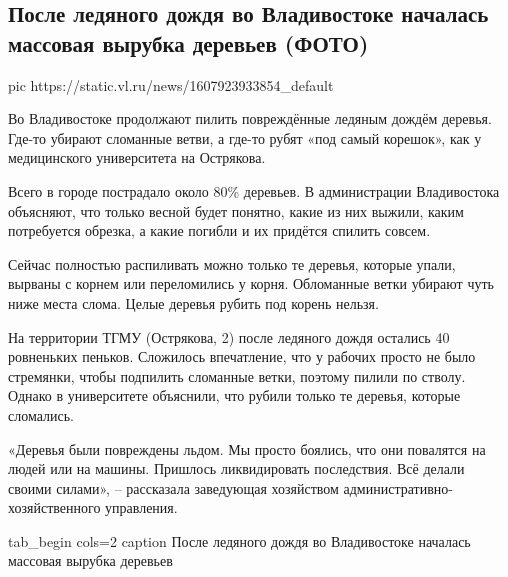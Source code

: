  
 
 
 
 
 
\subsection{После ледяного дождя во Владивостоке началась массовая вырубка деревьев (ФОТО)}
\label{sec:14_12_2020.news.ru.vladivostok.1.ledianoi_dozhd}


\ifcmt
  pic https://static.vl.ru/news/1607923933854_default
\fi

Во Владивостоке продолжают пилить повреждённые ледяным дождём деревья. Где-то
убирают сломанные ветви, а где-то рубят «под самый корешок», как у медицинского
университета на Острякова.

Всего в городе пострадало около 80\% деревьев. В администрации Владивостока
объясняют, что только весной будет понятно, какие из них выжили, каким
потребуется обрезка, а какие погибли и их придётся спилить совсем.

Сейчас полностью распиливать можно только те деревья, которые упали, вырваны с
корнем или переломились у корня. Обломанные ветки убирают чуть ниже места
слома. Целые деревья рубить под корень нельзя.

На территории ТГМУ (Острякова, 2) после ледяного дождя остались 40 ровненьких
пеньков. Сложилось впечатление, что у рабочих просто не было стремянки, чтобы
подпилить сломанные ветки, поэтому пилили по стволу. Однако в университете
объяснили, что рубили только те деревья, которые сломались.

«Деревья были повреждены льдом. Мы просто боялись, что они повалятся на людей
или на машины. Пришлось ликвидировать последствия. Всё делали своими силами», –
рассказала заведующая хозяйством административно-хозяйственного управления.

\ifcmt
tab_begin cols=2
	caption После ледяного дождя во Владивостоке началась массовая вырубка деревьев

